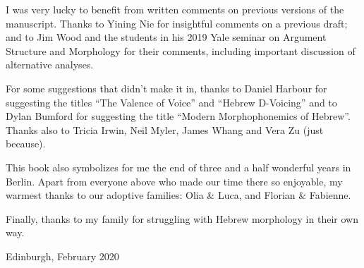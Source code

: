 I was very lucky to benefit from written comments on previous versions of the manuscript. Thanks to Yining Nie for insightful comments on a previous draft; and to Jim Wood and the students in his 2019 Yale seminar on Argument Structure and Morphology for their comments, including important discussion of alternative analyses.

For some suggestions that didn't make it in, thanks to Daniel Harbour for suggesting the titles ``The Valence of Voice'' and ``Hebrew D-Voicing'' and to Dylan Bumford for suggesting the title ``Modern Morphophonemics of Hebrew''. Thanks also to Tricia Irwin, Neil Myler, James Whang and Vera Zu (just because).

This book also symbolizes for me the end of three and a half wonderful years in Berlin. Apart from everyone above who made our time there so enjoyable, my warmest thanks to our adoptive families: Olia \& Luca, and Florian \& Fabienne.

Finally, thanks to my family for struggling with Hebrew morphology in their own way.

\bigskip

	\hfill Edinburgh, February 2020